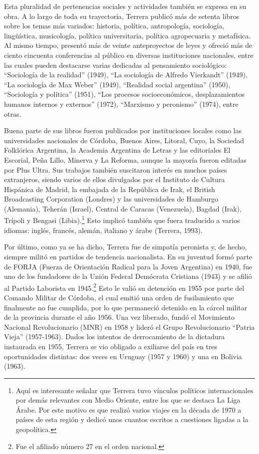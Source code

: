 Esta pluralidad de pertenencias sociales y actividades también se expresa en su obra. A lo largo de toda su trayectoria, Terrera publicó más de setenta libros sobre los temas más variados: historia, política, antropología, sociología, lingüística, musicología, política universitaria, política agropecuaria y metafísica. Al mismo tiempo, presentó más de veinte anteproyectos de leyes y ofreció más de ciento cincuenta conferencias al público en diversas instituciones nacionales, entre las cuales pueden destacarse varias dedicadas al pensamiento sociológico: \enquote{Sociología de la realidad} (1949), \enquote{La sociología de Alfredo Vierkandt} (1949), \enquote{La sociología de Max Weber} (1949), \enquote{Realidad social argentina} (1950), \enquote{Sociología y política} (1951), \enquote{Los procesos socioeconómicos, desplazamientos humanos internos y externos} (1972), \enquote{Marxismo y peronismo} (1974), entre otras.

Buena parte de sus libros fueron publicados por instituciones locales como las universidades nacionales de Córdoba, Buenos Aires, Litoral, Cuyo, la Sociedad Folklórica Argentina, la Academia Argentina de Letras y las editoriales El Escorial, Peña Lillo, Minerva y La Reforma, aunque la mayoría fueron editadas por Plus Ultra. Sus trabajos también suscitaron interés en muchos países extranjeros, siendo varios de ellos divulgados por el Instituto de Cultura Hispánica de Madrid, la embajada de la República de Irak, el British Broadcasting Corporation (Londres) y las universidades de Hamburgo (Alemania), Teherán (Israel), Central de Caracas (Venezuela), Bagdad (Irak), Trípoli y Bengasi (Libia).\footnote{Aquí es interesante señalar que Terrera tuvo vínculos políticos internacionales por demás relevantes con Medio Oriente, entre los que se destaca La Liga Árabe. Por este motivo es que realizó varios viajes en la década de 1970 a países de esta región y dedicó unos cuantos escritos a cuestiones ligadas a la geopolítica.} Esto implicó también que fuera traducido a varios idiomas: inglés, francés, alemán, italiano y árabe (Terrera, 1993).

Por último, como ya se ha dicho, Terrera fue de simpatía peronista y, de hecho, siempre militó en partidos de tendencia nacionalista. En su juventud formó parte de FORJA (Fuerza de Orientación Radical para la Joven Argentina) en 1940, fue uno de los fundadores de la Unión Federal Demócrata Cristiana (1943) y se afilió al Partido Laborista en 1945.\footnote{Fue el afiliado número 27 en el orden nacional.} Esto le valió su detención en 1955 por parte del Comando Militar de Córdoba, el cual emitió una orden de fusilamiento que finalmente no fue cumplida, por lo que permaneció detenido en la cárcel militar de la provincia durante el año 1956. Una vez liberado, fundó el Movimiento Nacional Revolucionario (MNR) en 1958 y lideró el Grupo Revolucionario \enquote{Patria Vieja} (1957-1963). Dados los intentos de derrocamiento de la dictadura instaurada en 1955, Terrera se vio obligado a exiliarse del país en tres oportunidades distintas: dos veces en Uruguay (1957 y 1960) y una en Bolivia (1963).

